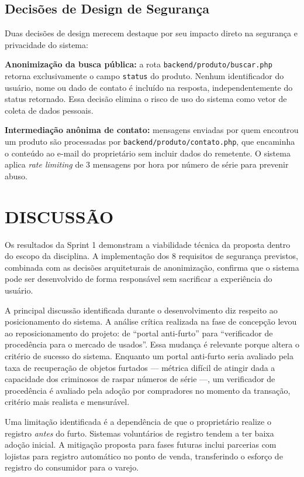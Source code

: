 \documentclass[12pt,a4paper]{article}
\begin{document}
\subsection{Decisões de Design de Segurança}

Duas decisões de design merecem destaque por seu impacto direto na segurança e privacidade do sistema:

\textbf{Anonimização da busca pública:} a rota \texttt{backend/produto/buscar.php} retorna exclusivamente o campo \texttt{status} do produto. Nenhum identificador do usuário, nome ou dado de contato é incluído na resposta, independentemente do status retornado. Essa decisão elimina o risco de uso do sistema como vetor de coleta de dados pessoais.

\textbf{Intermediação anônima de contato:} mensagens enviadas por quem encontrou um produto são processadas por \texttt{backend/produto/contato.php}, que encaminha o conteúdo ao e-mail do proprietário sem incluir dados do remetente. O sistema aplica \textit{rate limiting} de 3 mensagens por hora por número de série para prevenir abuso.

\section{DISCUSSÃO}

Os resultados da Sprint 1 demonstram a viabilidade técnica da proposta dentro do escopo da disciplina. A implementação dos 8 requisitos de segurança previstos, combinada com as decisões arquiteturais de anonimização, confirma que o sistema pode ser desenvolvido de forma responsável sem sacrificar a experiência do usuário.

A principal discussão identificada durante o desenvolvimento diz respeito ao posicionamento do sistema. A análise crítica realizada na fase de concepção levou ao reposicionamento do projeto: de ``portal anti-furto'' para ``verificador de procedência para o mercado de usados''. Essa mudança é relevante porque altera o critério de sucesso do sistema. Enquanto um portal anti-furto seria avaliado pela taxa de recuperação de objetos furtados — métrica difícil de atingir dada a capacidade dos criminosos de raspar números de série —, um verificador de procedência é avaliado pela adoção por compradores no momento da transação, critério mais realista e mensurável.

Uma limitação identificada é a dependência de que o proprietário realize o registro \textit{antes} do furto. Sistemas voluntários de registro tendem a ter baixa adoção inicial. A mitigação proposta para fases futuras inclui parcerias com lojistas para registro automático no ponto de venda, transferindo o esforço de registro do consumidor para o varejo.
\end{document}
